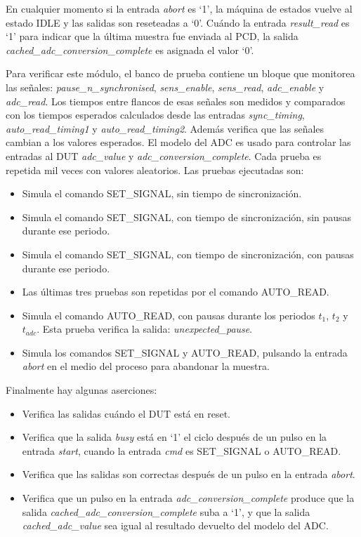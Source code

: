 \documentclass[a4paper, twoside, 11pt]{report}
\begin{document}
En cualquier momento si la entrada \textit{abort} es ‘1’, la máquina de estados vuelve al estado IDLE y las salidas son reseteadas a ‘0’. Cuándo la entrada \textit{result\_read} es ‘1’ para indicar que la última muestra fue enviada al PCD, la salida \textit{cached\_adc\_conversion\_complete} es asignada el valor ‘0’.

Para verificar este módulo, el banco de prueba contiene un bloque que monitorea las señales: \textit{pause\_n\_synchronised}, \textit{sens\_enable}, \textit{sens\_read}, \textit{adc\_enable} y \textit{adc\_read}. Los tiempos entre flancos de esas señales son medidos y comparados con los tiempos esperados calculados desde las entradas \textit{sync\_timing}, \textit{auto\_read\_timing1} y \textit{auto\_read\_timing2}. Además verifica que las señales cambian a los valores esperados. El modelo del ADC es usado para controlar las entradas al DUT \textit{adc\_value} y \textit{adc\_conversion\_complete}. Cada prueba es repetida mil veces con valores aleatorios. Las pruebas ejecutadas son:

\begin{itemize}
  \item Simula el comando SET\_SIGNAL, sin tiempo de sincronización.
  \item Simula el comando SET\_SIGNAL, con tiempo de sincronización, sin pausas durante ese periodo.
  \item Simula el comando SET\_SIGNAL, con tiempo de sincronización, con pausas durante ese periodo.
  \item Las últimas tres pruebas son repetidas por el comando AUTO\_READ.
  \item Simula el comando AUTO\_READ, con pausas durante los periodos $t_1$, $t_2$ y $t_{adc}$. Esta prueba verifica la salida: \textit{unexpected\_pause}.
  \item Simula los comandos SET\_SIGNAL y AUTO\_READ, pulsando la entrada \textit{abort} en el medio del proceso para abandonar la muestra.
\end{itemize}

Finalmente hay algunas aserciones:

\begin{itemize}
  \item Verifica las salidas cuándo el DUT está en reset.
  \item Verifica que la salida \textit{busy} está en ‘1’ el ciclo después de un pulso en la entrada \textit{start}, cuando la entrada \textit{cmd} es SET\_SIGNAL o AUTO\_READ.
  \item Verifica que las salidas son correctas después de un pulso en la entrada \textit{abort}.
  \item Verifica que un pulso en la entrada \textit{adc\_conversion\_complete} produce que la salida \textit{cached\_adc\_conversion\_complete} suba a ‘1’, y que la salida \textit{cached\_adc\_value} sea igual al resultado devuelto del modelo del ADC.
\end{itemize}
\end{document}

